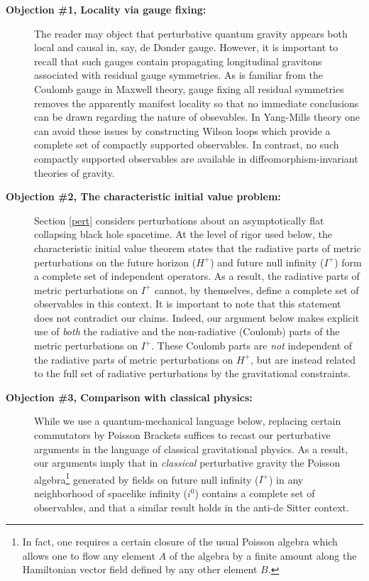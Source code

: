 \documentclass[12pt,onecolumn,eqsecnum,aps,prd,nofootinbib]{revtex4}
\begin{document}
\begin{description}


\item [{\bf Objection \#1,   Locality via gauge fixing:}]
The reader may object that perturbative quantum gravity appears both
local and causal in, say, de Donder gauge.  However, it is important to recall that such gauges contain propagating  longitudinal gravitons associated with residual gauge symmetries.  As is
familiar from the Coulomb gauge in Maxwell theory, gauge fixing all
residual symmetries removes the apparently manifest locality so that no immediate conclusions can be drawn regarding the nature of obsevables. In
Yang-Mills theory one can avoid these issues by constructing Wilson
loops which provide a complete set of compactly supported
observables.   In contrast, no such compactly supported observables are available
in diffeomorphism-invariant theories of gravity.

\item [{\bf Objection \#2,  The characteristic initial value problem:}]  Section \ref{pert} considers perturbations about an asymptotically flat collapsing black hole spacetime. At the level of rigor used below, the characteristic initial value theorem states that the radiative parts of metric perturbations on the future horizon ($H^+$) and future null infinity ($I^+$) form a complete set of independent operators.  As a result, the radiative parts of metric perturbations on $I^+$ cannot, by themselves, define a complete set of observables in this context.  It is important to note that this statement does not contradict our claims.  Indeed, our argument below makes explicit use of {\it both} the radiative and the non-radiative (Coulomb) parts of the metric perturbations on $I^+$. These Coulomb parts are {\it not} independent of the radiative parts of metric perturbations on $H^+$, but are instead related to the full set of radiative perturbations by the gravitational constraints.

\item [{\bf Objection \#3,  Comparison with classical physics:}]  While we use a quantum-mechanical language below, replacing certain commutators by Poisson Brackets suffices to recast our perturbative arguments in the language of classical gravitational physics.    As a result, our arguments imply that in {\it classical} perturbative gravity the Poisson algebra\footnote{In fact, one requires a certain closure of the usual Poisson algebra which allows one to flow any element $A$ of the algebra by a finite amount along the Hamiltonian vector field defined by any other element $B$.} generated  by fields on future null infinity ($I^+$) in any neighborhood of spacelike infinity ($i^0$) contains a complete set of observables, and that a similar result holds in the anti-de Sitter context.


\end{description}
\end{document}
